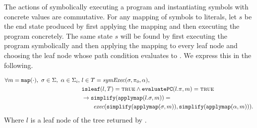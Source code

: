 \begin{property}[Commutativity]
  \label{prop:kingcommutativity}
  The actions of symbolically executing a program and instantiating symbols with
  concrete values are commutative. For any mapping of symbols to literals, let
  $s$ be the end state produced by first applying the mapping and then executing
  the program concretely. The
  same state $s$ will be found by first executing the program symbolically and
  then applying the mapping to every leaf node and choosing the leaf node whose path condition
  evaluates to \texttrue. We express this in the following. 





\begin{align*}
\forall m = \mathtt{map(\cdot)},~\sigma \in \Sigma,~\alpha \in \Sigma_i,~& l \in T = \mathit{symExec}(\sigma,\pi_0,\alpha), \\
&\mathtt{isleaf}(l,T)  = \mathtt{\textsc{true}} \wedge
\mathtt{evaluatePC}(l.\pi,m) = \mathtt{\textsc{true}} \\
&\rightarrow \mathtt{simplify}(\mathtt{applymap}(l.\sigma,m)) = \\
&\qquad\mathit{exec}(\mathtt{simplify}(\mathtt{applymap}(\sigma,m)),\mathtt{simplify}(\mathtt{applymap}(\alpha,m))).
\end{align*}
Where $l$ is a leaf node of the tree returned by \symexecution.


\end{property}

